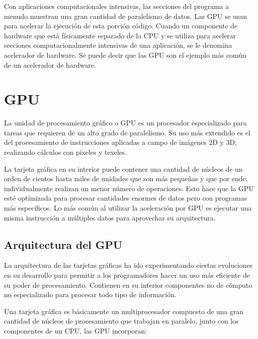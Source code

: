     \vspace{0.3cm}
    Con aplicaciones computacionales intensivas, las secciones del programa a menudo muestran una gran cantidad de paralelismo de datos. Las \acrshort{GPU} se usan para acelerar la ejecución de esta porción código. Cuando un componente de hardware que está físicamente separado de la \acrshort{CPU} y se utiliza para acelerar secciones computacionalmente intensivas de una aplicación, se le denomina acelerador de hardware. Se puede decir que las \acrshort{GPU} son el ejemplo más común de un acelerador de hardware.

    \section{\acrshort{GPU}}
   
    La unidad de procesamiento gráfico o \acrshort{GPU} es un procesador especializado para tareas que requieren de un alto grado de paralelismo. Su uso más extendido es el del procesamiento de instrucciones aplicadas a campo de imágenes 2D y 3D, realizando cálculos con \gls{pixel}es y \gls{texel}es\cite{TX2CU}.
    
   \vspace{0.3cm}
   
   La tarjeta gráfica en su interior puede contener una cantidad de núcleos de un orden de cientos hasta miles de unidades que son más pequeñas y que por ende, individualmente realizan un menor número de operaciones. Esto hace que la \acrshort{GPU} esté optimizada para procesar cantidades enormes de datos pero con programas más específicos\cite{gpgpu}. Lo más común al utilizar la aceleración por \acrshort{GPU} es ejecutar una misma instrucción a múltiples datos para aprovechar su arquitectura.
   
    \subsection{Arquitectura del \acrshort{GPU}}

La arquitectura de las tarjetas gráficas ha ido experimentando ciertas evoluciones en su desarrollo para permitir a los programadores hacer un uso más eficiente de su poder de procesamiento. Contienen en su interior componentes no de cómputo no especializado para procesar todo tipo de información.

Una tarjeta gráfica es básicamente un multiprocesador compuesto de una gran cantidad de núcleos de procesamiento que trabajan en paralelo, junto con los componentes de un \acrshort{CPU}, las \acrshort{GPU} incorporan:


